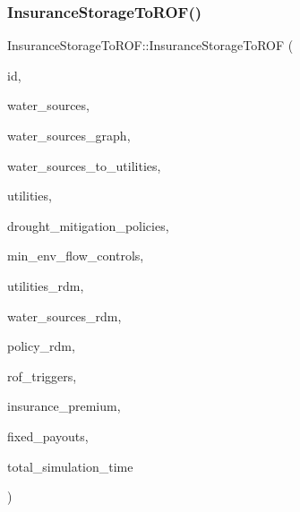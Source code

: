\subsubsection{\texorpdfstring{Insurance\+Storage\+To\+R\+O\+F()}{InsuranceStorageToROF()}\hspace{0.1cm}{\footnotesize\ttfamily [1/2]}}
{\footnotesize\ttfamily Insurance\+Storage\+To\+R\+O\+F\+::\+Insurance\+Storage\+To\+R\+OF (\begin{DoxyParamCaption}\item[{const int}]{id,  }\item[{vector$<$ \mbox{\hyperlink{classWaterSource}{Water\+Source}} $\ast$$>$ \&}]{water\+\_\+sources,  }\item[{const \mbox{\hyperlink{classGraph}{Graph}} \&}]{water\+\_\+sources\+\_\+graph,  }\item[{const vector$<$ vector$<$ int $>$$>$ \&}]{water\+\_\+sources\+\_\+to\+\_\+utilities,  }\item[{vector$<$ \mbox{\hyperlink{classUtility}{Utility}} $\ast$$>$ \&}]{utilities,  }\item[{vector$<$ \mbox{\hyperlink{classDroughtMitigationPolicy}{Drought\+Mitigation\+Policy}} $\ast$$>$ \&}]{drought\+\_\+mitigation\+\_\+policies,  }\item[{vector$<$ \mbox{\hyperlink{classMinEnvFlowControl}{Min\+Env\+Flow\+Control}} $\ast$$>$}]{min\+\_\+env\+\_\+flow\+\_\+controls,  }\item[{vector$<$ vector$<$ double $>$$>$ \&}]{utilities\+\_\+rdm,  }\item[{vector$<$ vector$<$ double $>$$>$ \&}]{water\+\_\+sources\+\_\+rdm,  }\item[{vector$<$ vector$<$ double $>$$>$ \&}]{policy\+\_\+rdm,  }\item[{vector$<$ double $>$ \&}]{rof\+\_\+triggers,  }\item[{const double}]{insurance\+\_\+premium,  }\item[{const vector$<$ double $>$ \&}]{fixed\+\_\+payouts,  }\item[{unsigned long}]{total\+\_\+simulation\+\_\+time }\end{DoxyParamCaption})}

\mbox{\label{classInsuranceStorageToROF_a5229c6bbb6da8268017c71bacec70f67_a5229c6bbb6da8268017c71bacec70f67}} 
